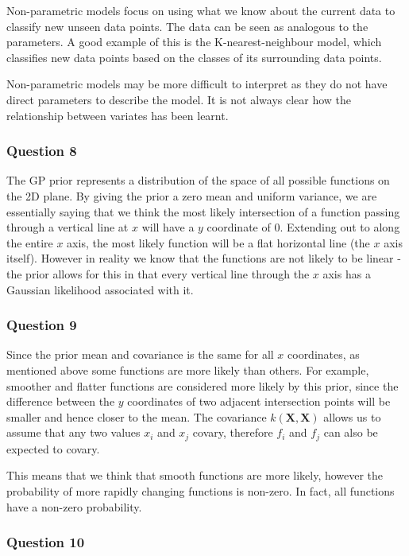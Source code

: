 \documentclass[10pt, a4paper, twocolumn]{article} %
\begin{document}
Non-parametric models focus on using what we know about the current data to classify new unseen data points. The data can be seen as analogous to the parameters. A good example of this is the K-nearest-neighbour model, which classifies new data points based on the classes of its surrounding data points. 

Non-parametric models may be more difficult to interpret as they do not have direct parameters to describe the model. It is not always clear how the relationship between variates has been learnt.

\subsubsection*{Question 8}

The GP prior represents a distribution of the space of all possible functions on the 2D plane. By giving the prior a zero mean and uniform variance, we are essentially saying that we think the most likely intersection of a function passing through a vertical line at $x$ will have a $y$ coordinate of 0. Extending out to along the entire $x$ axis, the most likely function will be a flat horizontal line (the $x$ axis itself). However in reality we know that the functions are not likely to be linear - the prior allows for this in that every vertical line through the $x$ axis has a Gaussian likelihood associated with it.

\subsubsection*{Question 9}

Since the prior mean and covariance is the same for all $x$ coordinates, as mentioned above some functions are more likely than others. For example, smoother and flatter functions are considered more likely by this prior, since the difference between the $y$ coordinates of two adjacent intersection points will be smaller and hence closer to the mean. The covariance $ k(\mathbf{X}, \mathbf{X})$ allows us to assume that any two values $x_i$ and $x_j$ covary, therefore $f_i$ and $f_j$ can also be expected to covary. 

This means that we think that smooth functions are more likely, however the probability of more rapidly changing functions is non-zero. In fact, all functions have a non-zero probability.

\subsubsection*{Question 10}
\end{document}
